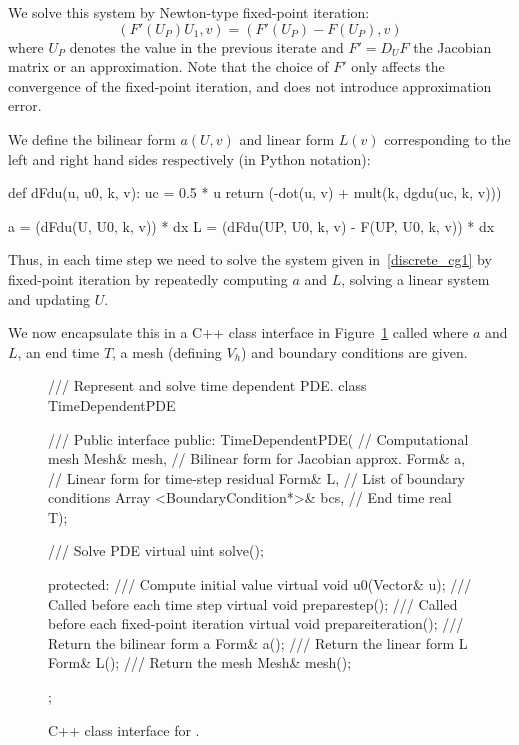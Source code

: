 We solve this system by Newton-type fixed-point iteration:
\begin{equation}
(F'(U_P) U_1, v) = (F'(U_P) - F(U_P), v)
\label{discrete_cg1}
\end{equation}
where $U_P$ denotes the value in the previous iterate and $F' = D_U F$
the Jacobian matrix or an approximation. Note that the choice of $F'$
only affects the convergence of the fixed-point iteration, and does not
introduce approximation error.

We define the bilinear form $a(U, v)$ and linear form $L(v)$ corresponding
to the left and right hand sides respectively (in Python notation):
\begin{python}
def dFdu(u, u0, k, v):
    uc = 0.5 * u
    return (-dot(u, v) + mult(k, dgdu(uc, k, v)))

a = (dFdu(U, U0, k, v)) * dx
L = (dFdu(UP, U0, k, v) - F(UP, U0, k, v)) * dx
\end{python}
Thus, in each time step we need to solve the system given
in~\eqref{discrete_cg1} by fixed-point iteration by repeatedly computing
$a$ and $L$, solving a linear system and updating $U$.

We now encapsulate this in a C++ class interface in
Figure~\ref{code:TimeDependentPDE} called  where $a$
and $L$, an end time $T$, a mesh (defining $V_h$) and boundary conditions
are given.

\begin{figure}
\begin{c++}
/// Represent and solve time dependent PDE.
class TimeDependentPDE
{
  /// Public interface
public:
  TimeDependentPDE(
   // Computational mesh
   Mesh& mesh,
   // Bilinear form for Jacobian approx.
   Form& a,
   // Linear form for time-step residual
   Form& L,
   // List of boundary conditions
   Array <BoundaryCondition*>& bcs,
   // End time
   real T);

  /// Solve PDE
  virtual uint solve();

protected:
  /// Compute initial value
  virtual void u0(Vector& u);
  /// Called before each time step
  virtual void preparestep();
  /// Called before each fixed-point iteration
  virtual void prepareiteration();
  /// Return the bilinear form a
  Form& a();
  /// Return the linear form L
  Form& L();
  /// Return the mesh
  Mesh& mesh();
};
\end{c++}
\caption{C++ class interface for .}
\label{code:TimeDependentPDE}
\end{figure}

